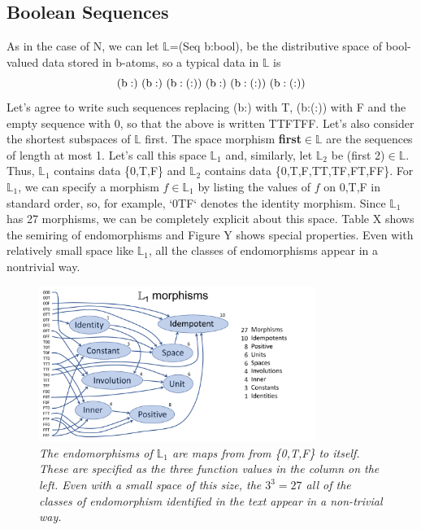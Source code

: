 \documentclass[11pt]{article}
\begin{document}
\subsection{Boolean Sequences}

As in the case of N, we can let $\mathbb L$=(Seq b:bool), be the distributive space of bool-valued data stored in b-atoms, so a typical data in $\mathbb L$ is 
\begin{equation}
{\rm (b:)\ (b:)\ (b:(:))\ (b:)\ (b:(:))\ (b:(:))}
\end{equation}
Let's agree to write such sequences replacing (b:) with T, (b:(:)) with F and the empty sequence with 0, so that the above is written TTFTFF.   
Let's also consider the shortest subspaces of $\mathbb L$ first.  The space morphism {\bf first}$\in\mathbb L$ are the sequences of length at most 1.  
Let's call this space ${\mathbb L}_1$ and, similarly, let ${\mathbb L}_2$ be (first 2)$\in\mathbb L$.  
Thus, ${\mathbb L}_1$ contains data \{0,T,F\} and ${\mathbb L}_2$ contains data \{0,T,F,TT,TF,FT,FF\}. 
For ${\mathbb L}_1$, we can specify a morphism $f\in {\mathbb L}_1$ by listing the values of $f$ on 0,T,F in standard order, so, for example, `0TF` denotes the identity morphism. 
Since ${\mathbb L}_1$ has 27 morphisms, we can be completely explicit about this space.  Table X shows the semiring of endomorphisms and Figure Y shows special 
properties.  Even with relatively small space like ${\mathbb L}_1$, all the classes of endomorphisms appear in a nontrivial way.

\begin{figure}[h]
\centering
\includegraphics[width=0.8\textwidth]{L1.pdf}
\caption{{\it The endomorphisms of ${\mathbb L}_1$ are maps from from \{0,T,F\} to itself. These are specified as the three function 
values in the column on the left.  Even with a small space of this size, the $3^3=27$ all of the classes of endomorphism identified in the text 
appear in a non-trivial way.}}
\end{figure}
\end{document}
